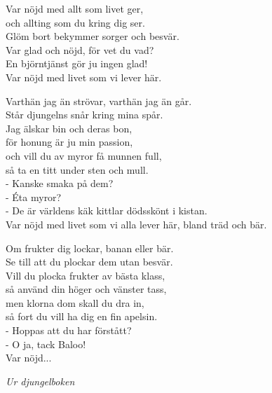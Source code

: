 \vspace{10pt}
Var nöjd med allt som livet ger,\\
och allting som du kring dig ser.\\
Glöm bort bekymmer sorger och besvär.\\
Var glad och nöjd, för vet du vad?\\
En björntjänst gör ju ingen glad!\\
Var nöjd med livet som vi lever här.\par
\vspace{10pt}
Varthän jag än strövar, varthän jag än går.\\
Står djungelns snår kring mina spår.\\
Jag älskar bin och deras bon,\\
för honung är ju min passion,\\
och vill du av myror få munnen full,\\
så ta en titt under sten och mull.\\
- Kanske smaka på dem?\\
- Éta myror?\\
- De är världens käk kittlar dödsskönt i kistan.\\
Var nöjd med livet som vi alla lever här, bland träd och bär.\par
\vspace{10pt}
Om frukter dig lockar, banan eller bär.\\
Se till att du plockar dem utan besvär.\\
Vill du plocka frukter av bästa klass,\\
så använd din höger och vänster tass,\\
men klorna dom skall du dra in,\\
så fort du vill ha dig en fin apelsin.\\
- Hoppas att du har förstått?\\
- O ja, tack Baloo!\\
Var nöjd...\par
\vspace{10pt}
{\footnotesize\textit{Ur djungelboken}}
